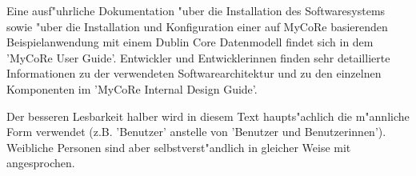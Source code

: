 Eine ausf"uhrliche Dokumentation "uber die Installation des Softwaresystems sowie 
"uber die Installation und Konfiguration einer auf MyCoRe basierenden
Beispielanwendung mit einem Dublin Core Datenmodell findet sich in dem
'MyCoRe User Guide'.
Entwickler und Entwicklerinnen finden sehr detaillierte Informationen
zu der verwendeten Softwarearchitektur und zu den einzelnen Komponenten
im 'MyCoRe Internal Design Guide'.

Der besseren Lesbarkeit halber wird in diesem Text haupts"achlich die m"annliche 
Form verwendet (z.B. 'Benutzer' anstelle von 'Benutzer und Benutzerinnen'). 
Weibliche Personen sind aber selbstverst"andlich in gleicher Weise mit angesprochen.
 